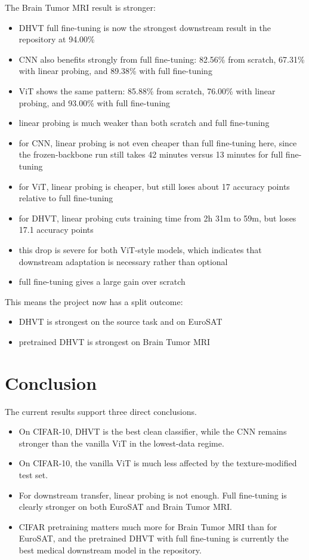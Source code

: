 \documentclass[11pt]{article}
\begin{document}
The Brain Tumor MRI result is stronger:
\begin{itemize}
    \item DHVT full fine-tuning is now the strongest downstream result in the repository at 94.00\%
    \item CNN also benefits strongly from full fine-tuning: 82.56\% from scratch, 67.31\% with linear probing, and 89.38\% with full fine-tuning
    \item ViT shows the same pattern: 85.88\% from scratch, 76.00\% with linear probing, and 93.00\% with full fine-tuning
    \item linear probing is much weaker than both scratch and full fine-tuning
    \item for CNN, linear probing is not even cheaper than full fine-tuning here, since the frozen-backbone run still takes 42 minutes versus 13 minutes for full fine-tuning
    \item for ViT, linear probing is cheaper, but still loses about 17 accuracy points relative to full fine-tuning
    \item for DHVT, linear probing cuts training time from 2h 31m to 59m, but loses 17.1 accuracy points
    \item this drop is severe for both ViT-style models, which indicates that downstream adaptation is necessary rather than optional
    \item full fine-tuning gives a large gain over scratch
\end{itemize}

This means the project now has a split outcome:
\begin{itemize}
    \item DHVT is strongest on the source task and on EuroSAT
    \item pretrained DHVT is strongest on Brain Tumor MRI
\end{itemize}

\section{Conclusion}
The current results support three direct conclusions.

\begin{itemize}
    \item On CIFAR-10, DHVT is the best clean classifier, while the CNN remains stronger than the vanilla ViT in the lowest-data regime.
    \item On CIFAR-10, the vanilla ViT is much less affected by the texture-modified test set.
    \item For downstream transfer, linear probing is not enough. Full fine-tuning is clearly stronger on both EuroSAT and Brain Tumor MRI.
    \item CIFAR pretraining matters much more for Brain Tumor MRI than for EuroSAT, and the pretrained DHVT with full fine-tuning is currently the best medical downstream model in the repository.
\end{itemize}
\end{document}
